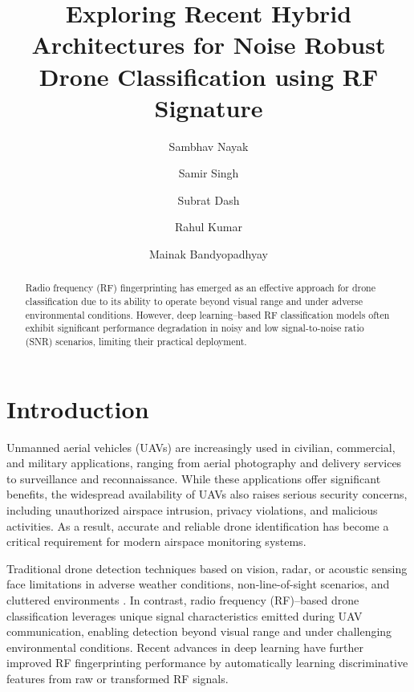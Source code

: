 \documentclass[runningheads]{llncs}
\begin{document}
\title{Exploring Recent Hybrid Architectures for Noise Robust Drone Classification using RF
Signature}


\author{Sambhav Nayak \and 
        Samir Singh \and 
        Subrat Dash \and 
        Rahul Kumar \and 
        Mainak Bandyopadhyay}

\maketitle

\begin{abstract}
Radio frequency (RF) fingerprinting has emerged as an effective approach for drone classification due to its ability to operate beyond visual range and under adverse environmental conditions. However, deep learning–based RF classification models often exhibit significant performance degradation in noisy and low signal-to-noise ratio (SNR) scenarios, limiting their practical deployment.

\end{abstract}

\section{Introduction}
Unmanned aerial vehicles (UAVs) are increasingly used in civilian, commercial, and military applications, ranging from aerial photography and delivery services to surveillance and reconnaissance. While these applications offer significant benefits, the widespread availability of UAVs also raises serious security concerns, including unauthorized airspace intrusion, privacy violations, and malicious activities. As a result, accurate and reliable drone identification has become a critical requirement for modern airspace monitoring systems.

Traditional drone detection techniques based on vision, radar, or acoustic sensing face limitations in adverse weather conditions, non-line-of-sight scenarios, and cluttered environments \cite{ref1}. In contrast, radio frequency (RF)–based drone classification leverages unique signal characteristics emitted during UAV communication, enabling detection beyond visual range and under challenging environmental conditions. Recent advances in deep learning have further improved RF fingerprinting performance by automatically learning discriminative features from raw or transformed RF signals.
\end{document}
